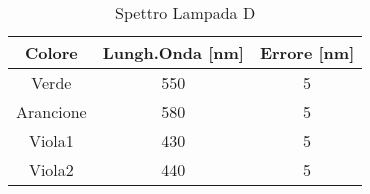 \begin{table}[H]
    \begin{center}
    \caption{Spettro Lampada D}
    \begin{tabular}{|c|c|c|}
        \hline
        Colore & Lungh.Onda [nm] & Errore [nm]\\ 
        \hline
        Verde & 550 & 5 \\ 
        Arancione & 580 & 5 \\ 
        Viola1 & 430 & 5 \\ 
        Viola2 & 440 & 5 \\ 
        \hline
    \end{tabular}
    \end{center}
    \label{label}
\end{table}
